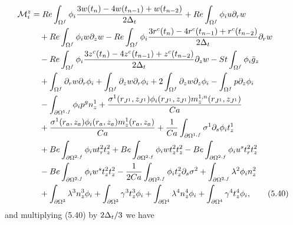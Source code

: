 \documentclass{article}
\begin{document}
\begin{align}
\mathcal{M}_i^z &= Re \int_{\Omega^f} \phi_i \frac{3w(t_n) - 4w(t_{n-1}) + w(t_{n-2})}{2\Delta_t} + Re \int_{\Omega^f} \phi_i u \partial_r w \nonumber\\
&\quad + Re \int_{\Omega^f} \phi_i w \partial_z w - Re \int_{\Omega^f} \phi_i \frac{3r^c(t_n) - 4r^c(t_{n-1}) + r^c(t_{n-2})}{2\Delta_t} \partial_r w \nonumber\\
&\quad - Re \int_{\Omega^f} \phi_i \frac{3z^c(t_n) - 4z^c(t_{n-1}) + z^c(t_{n-2})}{2\Delta_t} \partial_z w - St \int_{\Omega^f} \phi_i \bar{g}_z \nonumber\\
&\quad + \int_{\Omega^f} \partial_r w \partial_r \phi_i + \int_{\Omega^f} \partial_z w \partial_r \phi_i + 2 \int_{\Omega^f} \partial_z w \partial_z \phi_i - \int_{\Omega^f} p \partial_z \phi_i \nonumber\\
&\quad - \int_{\partial \Omega^{1,f}} \phi_i p^g n_z^1 + \frac{\sigma^1(r_{J^1},z_{J^1}) \phi_i(r_{J^1},z_{J^1}) m_z^{1,n}(r_{J^1},z_{J^1})}{Ca} \nonumber\\
&\quad + \frac{\sigma^1(r_a,z_a) \phi_i(r_a,z_a) m_z^{1}(r_a,z_a)}{Ca} + \frac{1}{Ca} \int_{\partial \Omega^{1,f}} \sigma^1 \partial_s \phi_i t_z^1 \nonumber\\
&\quad + Be \int_{\partial \Omega^{2,f}} \phi_i u t_r^2 t_z^2 + Be \int_{\partial \Omega^{2,f}} \phi_i w t_z^2 t_z^2 - Be \int_{\partial \Omega^{2,f}} \phi_i u^s t_r^2 t_z^2 \nonumber\\
&\quad - Be \int_{\partial \Omega^{2,f}} \phi_i w^s t_z^2 t_z^2 - \frac{1}{2Ca} \int_{\partial \Omega^{2,f}} \phi_i t_z^2 \partial_s \sigma^2 + \int_{\partial \Omega^{2,f}} \lambda^2 \phi_i n_z^2 \nonumber\\
&\quad + \int_{\partial \Omega^{3}} \lambda^3 n_z^3 \phi_i + \int_{\partial \Omega^{3}} \gamma^3 t_z^3 \phi_i + \int_{\partial \Omega^{4}} \lambda^4 n_z^4 \phi_i + \int_{\partial \Omega^{4}} \gamma^4 t_z^4 \phi_i, \tag{5.40}
\end{align}
and multiplying (5.40) by $2\Delta_t/3$ we have
\end{document}
